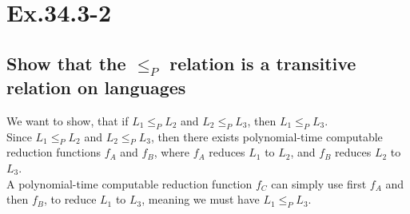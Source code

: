 \section*{Ex.34.3-2}
\subsection*{Show that the $\leq_P$ relation is a transitive relation on languages}

We want to show, that if $L_1\leq_P L_2$ and $L_2\leq_P L_3$, then $L_1\leq_P L_3$.
\\
Since $L_1\leq_P L_2$ and $L_2\leq_P L_3$, then there exists polynomial-time computable reduction functions $f_A$ and $f_B$, where $f_A$ reduces $L_1$ to $L_2$, and $f_B$ reduces $L_2$ to $L_3$.
\\
A polynomial-time computable reduction function $f_C$ can simply use first $f_A$ and then $f_B$, to reduce $L_1$ to $L_3$, meaning we must have $L_1\leq_P L_3$.